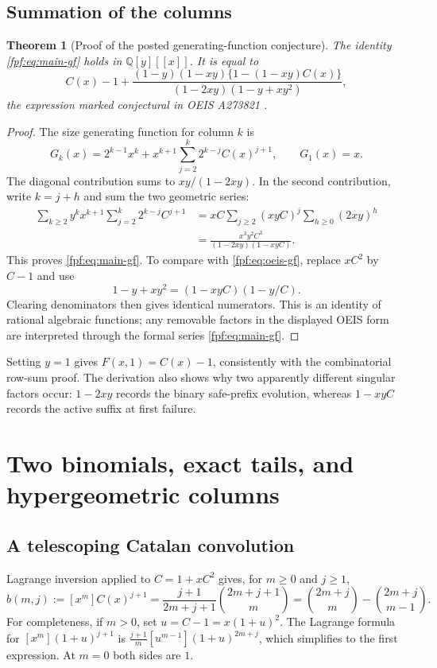 \documentclass[11pt]{article}
\numberwithin{equation}{section}
\newtheorem{theorem}{Theorem}[section]
\theoremstyle{definition}
\begin{document}
\subsection{Summation of the columns}
\begin{theorem}[Proof of the posted generating-function conjecture]
The identity \eqref{fpf:eq:main-gf} holds in $\mathbb Q[y][[x]]$. It is equal to
\begin{equation}\label{fpf:eq:oeis-gf}
 C(x)-1+
 \frac{(1-y)(1-xy)\{1-(1-xy)C(x)\}}
 {(1-2xy)(1-y+xy^2)},
\end{equation}
the expression marked conjectural in OEIS A273821 \cite{oeis273821}.
\end{theorem}
\begin{proof}
The size generating function for column $k$ is
\begin{equation}\label{fpf:eq:column-gf}
 G_k(x)=2^{k-1}x^k+x^{k+1}\sum_{j=2}^k2^{k-j}C(x)^{j+1},
 \qquad G_1(x)=x.
\end{equation}
The diagonal contribution sums to $xy/(1-2xy)$. In the second contribution,
write $k=j+h$ and sum the two geometric series:
\begin{align*}
 \sum_{k\ge2}y^kx^{k+1}\sum_{j=2}^k2^{k-j}C^{j+1}
 &=xC\sum_{j\ge2}(xyC)^j\sum_{h\ge0}(2xy)^h\\
 &=\frac{x^3y^2C^3}{(1-2xy)(1-xyC)}.
\end{align*}
This proves \eqref{fpf:eq:main-gf}. To compare with \eqref{fpf:eq:oeis-gf}, replace
$xC^2$ by $C-1$ and use
\[
 1-y+xy^2=(1-xyC)(1-y/C).
\]
Clearing denominators then gives identical numerators. This is an identity
of rational algebraic functions; any removable factors in the displayed
OEIS form are interpreted through the formal series \eqref{fpf:eq:main-gf}.
\end{proof}
Setting $y=1$ gives $F(x,1)=C(x)-1$, consistently with the combinatorial
row-sum proof. The derivation also shows why two apparently different
singular factors occur: $1-2xy$ records the binary safe-prefix evolution,
whereas $1-xyC$ records the active suffix at first failure.

\section{Two binomials, exact tails, and hypergeometric columns}

\subsection{A telescoping Catalan convolution}
Lagrange inversion applied to $C=1+xC^2$ gives, for $m\ge0$ and $j\ge1$,
\begin{equation}\label{fpf:eq:ballot}
 b(m,j):=[x^m]C(x)^{j+1}
 =\frac{j+1}{2m+j+1}\binom{2m+j+1}{m}
 =\binom{2m+j}{m}-\binom{2m+j}{m-1}.
\end{equation}
For completeness, if $m>0$, set $u=C-1=x(1+u)^2$. The Lagrange formula
for $[x^m](1+u)^{j+1}$ is
$\frac{j+1}{m}[u^{m-1}](1+u)^{2m+j}$, which simplifies to the first
expression. At $m=0$ both sides are $1$.
\end{document}
